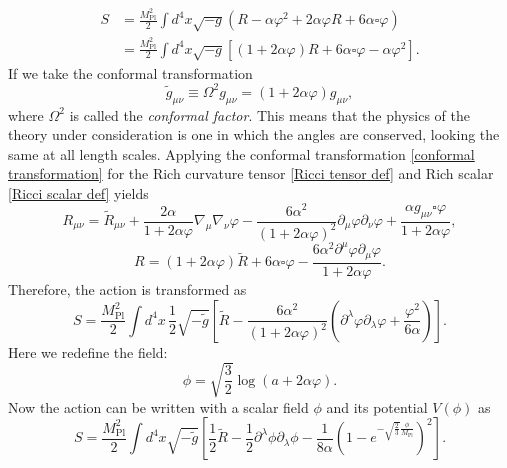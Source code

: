 \documentclass[12pt]{article}
\numberwithin{equation}{section}
\begin{document}
\begin{align}
    S &= \frac{M_{\textrm{Pl}}^2}{2}\int d^4 x \sqrt{-g}(R -\alpha\varphi^2 + 2\alpha\varphi R + 6\alpha \square \varphi)\\
    &= \frac{M_{\textrm{Pl}}^2}{2}\int d^4 x \sqrt{-g}[(1 + 2\alpha\varphi)R + 6\alpha \square \varphi - \alpha\varphi^2].
\end{align}
If we take the conformal transformation
\begin{equation}\label{conformal transformation}
    \tilde{g}_{\mu\nu} \equiv \Omega^2 g_{\mu\nu} = (1 + 2\alpha\varphi)g_{\mu\nu},
\end{equation}
where $\Omega^2$ is called the \textit{conformal factor}. This means that the physics of the theory under consideration is one in which the angles are conserved, looking the same at all length scales. Applying the conformal transformation \eqref{conformal transformation} for the Rich curvature tensor \eqref{Ricci tensor def} and Rich scalar \eqref{Ricci scalar def} yields
\begin{equation}
    R_{\mu\nu} = \tilde{R}_{\mu\nu} + \frac{2\alpha}{1 + 2\alpha\varphi}\nabla_\mu \nabla_\nu \varphi - \frac{6\alpha^2}{(1 + 2\alpha\varphi)^2}\partial_\mu \varphi \partial_\nu \varphi + \frac{\alpha g_{\mu\nu}\square\varphi}{1 + 2\alpha\varphi},
\end{equation}
\begin{equation}
    R = (1 + 2\alpha\varphi)\tilde{R} + 6\alpha\square\varphi - \frac{6\alpha^2 \partial^\mu \varphi \partial_\mu \varphi}{1 + 2\alpha\varphi}.
\end{equation}
Therefore, the action is transformed as
\begin{equation}
    S = \frac{M_{\textrm{Pl}}^2}{2}\int d^4 x \,\frac{1}{2}\sqrt{-\tilde{g}}\left[ \tilde{R} - \frac{6\alpha^2}{(1 + 2\alpha\varphi)^2} \left( \partial^\lambda \varphi \partial_\lambda \varphi + \frac{\varphi^2}{6\alpha} \right)\right].
\end{equation}
Here we redefine the field:
\begin{equation}
    \phi = \sqrt{\frac{3}{2}}\log (a + 2\alpha\varphi).
\end{equation}
Now the action can be written with a scalar field $\phi$ and its potential $V(\phi)$ as
\begin{equation}
    S = \frac{M_{\textrm{Pl}}^2}{2}\int d^4 x \sqrt{-\tilde{g}}\left[ \frac{1}{2}\tilde{R} - \frac{1}{2}\partial^\lambda \phi \partial_\lambda \phi -\frac{1}{8\alpha}\left( 1 - e^{-\sqrt{\frac{2}{3}}\frac{\phi}{M_{\textrm{Pl}}}} \right)^2 \right].
\end{equation}
\end{document}
